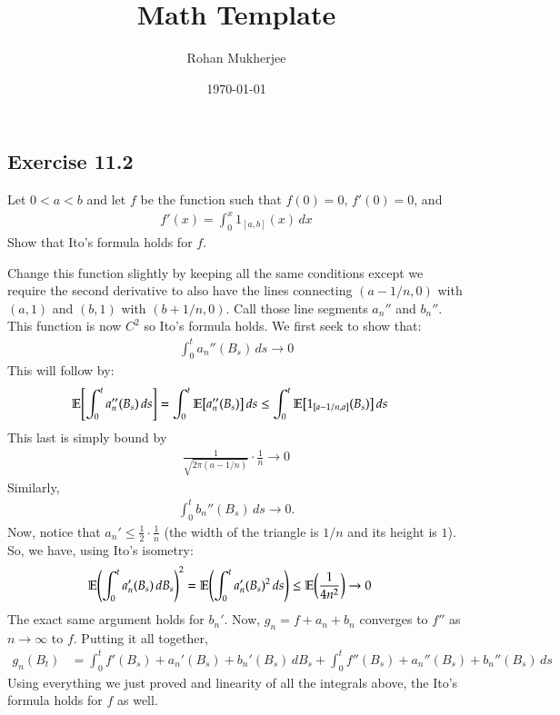 \documentclass[12pt]{article}
\title{Math Template}
\date{\today}
\author{Rohan Mukherjee}
\theoremstyle{definitionstyle}
\newcommand{\1}{\mathds 1}
\newcommand{\E}{\mathbb E \qty}
\begin{document}
    \maketitle
    \subsection*{Exercise 11.2}
    Let $0<a<b$ and let $f$ be the function such that $f(0) = 0$, $f'(0) = 0$, and
    \begin{align*}
        f'(x) = \int_0^x 1_{[a,b]}(x) \, dx
    \end{align*}
    Show that Ito's formula holds for $f$. 
    
    Change this function slightly by keeping all the same conditions except we require the second derivative to also have the lines connecting $(a-1/n, 0)$ with $(a,1)$ and $(b,1)$ with $(b+1/n, 0)$. Call those line segments $a_n''$ and $b_n''$. This function is now $C^2$ so Ito's formula holds. We first seek to show that:
    \begin{align*}
        \int_0^t a_n''(B_s) \, ds \to 0
    \end{align*}
    This will follow by:
    \begin{align*}
        \E [\int_0^t a_n''(B_s) \, ds] &= \int_0^t \E[a_n''(B_s)] \, ds \leq \int_0^t \E[1_{[a-1/n, a]}(B_s)] \, ds
    \end{align*}
    This last is simply bound by
    \begin{align*}
        \frac{1}{\sqrt{2 \pi (a - 1/n)}} \cdot \frac 1n \to 0
    \end{align*}
    Similarly,
    \begin{align*}
        \int_0^t b_n''(B_s) \, ds \to 0.
    \end{align*}
    Now, notice that $a_n' \leq \frac 12 \cdot \frac 1n$ (the width of the triangle is $1/n$ and its height is $1$). So, we have, using Ito's isometry:
    \begin{align*}
        \E(\int_0^t a_n'(B_s) \, dB_s)^2 &= \E (\int_0^t a_n'(B_s)^2 \, ds) \leq \E (\frac{1}{4n^2}) \to 0
    \end{align*}
    The exact same argument holds for $b_n'$. Now, $g_n = f + a_n + b_n$ converges to $f''$ as $n \to \infty$ to $f$. Putting it all together,
    \begin{align*}
        g_n(B_t) &= \int_0^t f'(B_s) + a_n'(B_s) + b_n'(B_s) \, dB_s + \int_0^t f''(B_s) + a_n''(B_s) + b_n''(B_s) \, ds
    \end{align*}
    Using everything we just proved and linearity of all the integrals above, the Ito's formula holds for $f$ as well.
\end{document}
